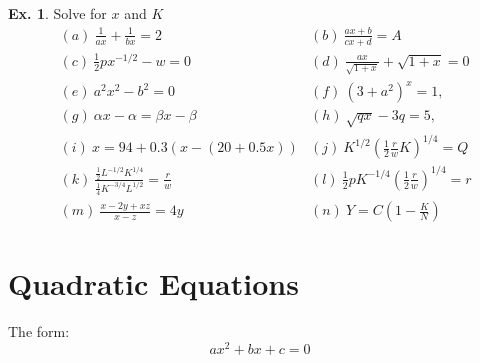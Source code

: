 \documentclass[10pt,a4paper]{book}
\theoremstyle{definition}\newtheorem{definition}{Definition}
\theoremstyle{definition}\newtheorem{fact}{Fact}
\theoremstyle{definition}\newtheorem{ex}{Ex.}
\theoremstyle{definition}\newtheorem{project}{Project}
\theoremstyle{definition}\newtheorem{problem}{Problem}
\theoremstyle{definition}\newtheorem{example}{Example}
\numberwithin{theorem}{chapter}
\numberwithin{corollary}{chapter}
\numberwithin{assumption}{chapter}
\numberwithin{definition}{chapter}
\numberwithin{prop}{chapter}
\numberwithin{notation}{chapter}
\numberwithin{problem}{chapter}
\numberwithin{example}{chapter}
\numberwithin{fact}{chapter}
\numberwithin{ex}{chapter}
\begin{document}
	\begin{ex}
		Solve for $x$ and $K$
		\begin{align*}
			& (a) \ \frac{1}{ax} + \frac{1}{bx} = 2     & (b)\ \frac{ax+b}{cx+d} = A                                      \\
			& (c) \ \frac{1}{2}p x^{-1/2} - w = 0       & (d) \ \frac{ax}{\sqrt{1+x}} + \sqrt{1+x} = 0                    \\
			& (e) \ a^2 x^2 - b^2 = 0                   & (f) \ (3+a^2)^x = 1,                                            \\
			& (g) \ \alpha x - \alpha = \beta x - \beta & (h)\ \sqrt{q x} - 3q = 5,                                       \\
			& (i) \ x = 94 + 0.3(x - (20+0.5x))         & (j)\ K^{1/2} \left( \frac{1}{2} \frac{r}{w} K \right)^{1/4} = Q \\
			&(k) \ \frac{\frac{1}{2} L^{-1/2} K^{1/4}}{\frac{1}{4} K^{-3/4} L^{1/2}} = \frac{r}{w} 
			&(l)\ \frac{1}{2}p K^{-1/4} \left(\frac{1}{2}\frac{r}{w}\right)^{1/4} = r \\
			& (m)\ \frac{x - 2y + xz}{x-z} = 4y         & (n)\ Y = C \left( 1-\frac{K}{N} \right)                         
		\end{align*}
	\end{ex}
	
	\section{Quadratic Equations}
	The form:
	\begin{equation}
		a x^2 + b x + c = 0 \label{eq:quad_form}
	\end{equation}
	
\end{document}
